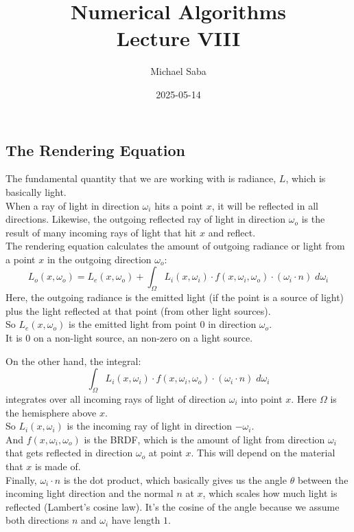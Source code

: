 \documentclass[12pt]{article}
\title{%
    \Huge Numerical Algorithms \\
    \Large Lecture VIII
}
\date{2025-05-14}
\author{Michael Saba}
\begin{document}
\maketitle
\newpage
\setlength{\parindent}{0pt}

\subsection*{The Rendering Equation}

The fundamental quantity that we are working
with is radiance, $L$, which is basically light. \\

When a ray of light in direction $\omega_i$
hits a point $x$, it will be reflected in all directions.
Likewise, the outgoing reflected ray of light in
direction $\omega_o$ is the result of many incoming
rays of light that hit $x$ and reflect. \\

The rendering equation calculates the amount of
outgoing radiance or light from a point $x$
in the outgoing direction $\omega_o$:
\[ L_{o}(x, \omega_o)
= L_{e}(x, \omega_o)
+ \int_\Omega L_{i}(x, \omega_i) \cdot
f(x, \omega_i, \omega_o) \cdot
(\omega_i \cdot n) \; d\omega_i \]
Here, the outgoing radiance is the emitted light
(if the point is a source of light)
plus the light reflected at that point (from other
light sources). \\

So $L_{e}(x, \omega_o)$ is the emitted light 
from point $0$ in direction $\omega_o$. \\
It is $0$ on a non-light source, an non-zero
on a light source.
 
On the other hand, the integral:
\[ \int_\Omega L_{i}(x, \omega_i) \cdot
f(x, \omega_i, \omega_o) \cdot
(\omega_i \cdot n) \; d\omega_i \]
integrates over all incoming rays of light
of direction $\omega_i$ into point $x$.
Here $\Omega$ is the hemisphere above $x$. \\
So $L_{i}(x, \omega_i)$ is the incoming ray
of light in direction $-\omega_i$. \\
And $f(x, \omega_i, \omega_o)$ is the BRDF, 
which is the amount of light from direction $\omega_i$
that gets reflected in direction $\omega_o$
at point $x$.
This will depend on the material that $x$ is made of. \\
Finally, $\omega_i \cdot n$ is the dot product,
which basically gives us the angle $\theta$
between the incoming light direction and the normal
$n$ at $x$, which scales how much light is reflected
(Lambert's cosine law).
It's the cosine of the angle because we 
assume both directions $n$ and $\omega_i$
have length $1$. \\
\end{document}
